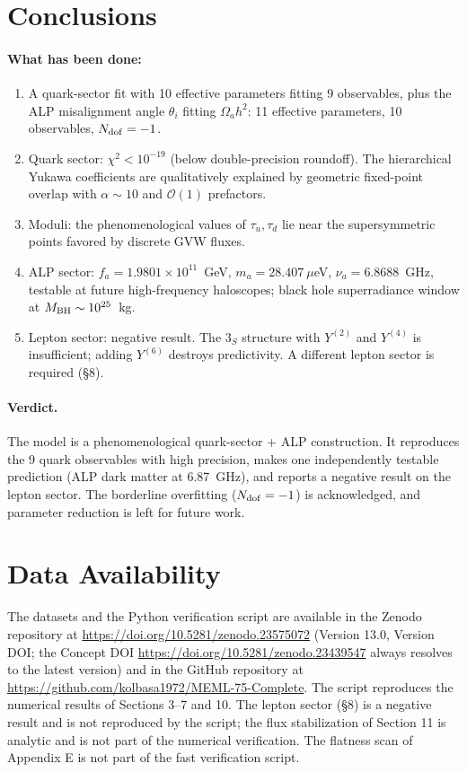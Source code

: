\documentclass[12pt,a4paper]{article}
\numberwithin{equation}{section}
\begin{document}
\section{Conclusions}
\paragraph{What has been done:}
\begin{enumerate}[leftmargin=1.5em]
\item A quark-sector fit with 10 effective parameters fitting 9 observables, plus the ALP misalignment angle \(\theta_i\) fitting \(\Omega_a h^2\): 11 effective parameters, 10 observables, \(N_{\rm dof} = -1\).
\item Quark sector: \(\chi^2 < 10^{-19}\) (below double-precision roundoff). The hierarchical Yukawa coefficients are qualitatively explained by geometric fixed-point overlap with \(\alpha \sim 10\) and \(\mathcal{O}(1)\) prefactors.
\item Moduli: the phenomenological values of \(\tau_u, \tau_d\) lie near the supersymmetric points favored by discrete GVW fluxes.
\item ALP sector: \(f_a = 1.9801 \times 10^{11}\)~GeV, \(m_a = 28.407~\mu\)eV, \(\nu_a = 6.8688\)~GHz, testable at future high-frequency haloscopes; black hole superradiance window at \(M_{\rm BH} \sim 10^{25}\)~kg.
\item Lepton sector: negative result. The \(3_S\) structure with \(Y^{(2)}\) and \(Y^{(4)}\) is insufficient; adding \(Y^{(6)}\) destroys predictivity. A different lepton sector is required (\S8).
\end{enumerate}
\paragraph{Verdict.} The model is a phenomenological quark-sector + ALP construction. It reproduces the 9 quark observables with high precision, makes one independently testable prediction (ALP dark matter at 6.87~GHz), and reports a negative result on the lepton sector. The borderline overfitting (\(N_{\rm dof} = -1\)) is acknowledged, and parameter reduction is left for future work.

\section*{Data Availability}
The datasets and the Python verification script are available in the Zenodo repository at \url{https://doi.org/10.5281/zenodo.23575072} (Version 13.0, Version DOI; the Concept DOI \url{https://doi.org/10.5281/zenodo.23439547} always resolves to the latest version) and in the GitHub repository at \url{https://github.com/kolbasa1972/MEML-75-Complete}. The script reproduces the numerical results of Sections 3--7 and 10. The lepton sector (\S8) is a negative result and is not reproduced by the script; the flux stabilization of Section 11 is analytic and is not part of the numerical verification. The flatness scan of Appendix E is not part of the fast verification script.
\end{document}
